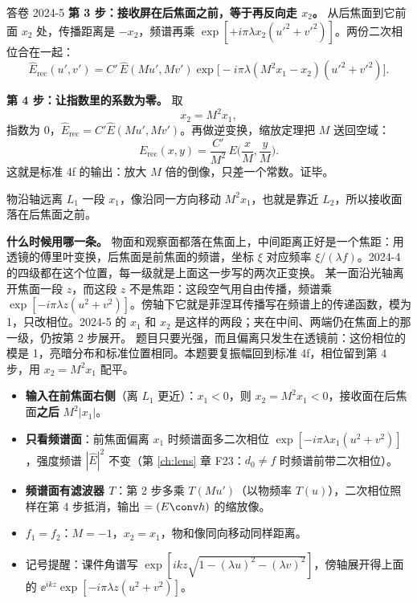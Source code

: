 \begin{exam}{答卷 2024-5}
\textbf{第 3 步：接收屏在后焦面之前，等于再反向走 $x_2$。}
从后焦面到它前面 $x_2$ 处，传播距离是 $-x_2$，频谱再乘 $\exp[+i\pi\lambda x_2(u'^2+v'^2)]$。两份二次相位合在一起：
\[
\hat E_{\text{rec}}(u',v')=C'\,\hat E(Mu',Mv')\exp\!\big[-i\pi\lambda(M^2x_1-x_2)(u'^2+v'^2)\big].
\]

\textbf{第 4 步：让指数里的系数为零。}
取
\[
\boxed{x_2=M^2x_1},
\]
指数为 0，$\hat E_{\text{rec}}=C'\hat E(Mu',Mv')$。再做逆变换，缩放定理把 $M$ 送回空域：
\[
E_{\text{rec}}(x,y)=\frac{C'}{M^2}\,E\Big(\frac xM,\frac yM\Big).
\]
这就是标准 4f 的输出：放大 $M$ 倍的倒像，只差一个常数。证毕。

物沿轴远离 $L_1$ 一段 $x_1$，像沿同一方向移动 $M^2x_1$，也就是靠近 $L_2$，所以接收面落在后焦面之前。

\textbf{什么时候用哪一条。}
物面和观察面都落在焦面上，中间距离正好是一个焦距：用透镜的傅里叶变换，后焦面是前焦面的频谱，坐标 $\xi$ 对应频率 $\xi/(\lambda f)$。2024-4 的四级都在这个位置，每一级就是上面这一步写的两次正变换。
某一面沿光轴离开焦面一段 $z$，而这段 $z$ 不是焦距：这段空气用自由传播，频谱乘 $\exp[-i\pi\lambda z(u^2+v^2)]$。傍轴下它就是菲涅耳传播写在频谱上的传递函数，模为 1，只改相位。2024-5 的 $x_1$ 和 $x_2$ 是这样的两段；夹在中间、两端仍在焦面上的那一级，仍按第 2 步展开。
题目只要光强，而且偏离只发生在透镜前：这份相位的模是 1，亮暗分布和标准位置相同。本题要复振幅回到标准 4f，相位留到第 4 步，用 $x_2=M^2x_1$ 配平。
\end{exam}

\begin{warn}[变式]
\begin{itemize}
\item \textbf{输入在前焦面右侧}（离 $L_1$ 更近）：$x_1<0$，则 $x_2=M^2x_1<0$，接收面在后焦面\textbf{之后} $M^2|x_1|$。
\item \textbf{只看频谱面}：前焦面偏离 $x_1$ 时频谱面多二次相位 $\exp[-i\pi\lambda x_1(u^2+v^2)]$，强度频谱 $|\hat E|^2$ 不变（第 \ref{ch:lens} 章 F23：$d_0\ne f$ 时频谱前带二次相位）。
\item \textbf{频谱面有滤波器 $T$}：第 2 步多乘 $T(Mu')$（以物频率 $T(u)$），二次相位照样在第 4 步抵消，输出 $=(E\conv h)$ 的缩放像。
\item \textbf{$f_1=f_2$}：$M=-1$，$x_2=x_1$，物和像同向移动同样距离。
\item 记号提醒：课件角谱写 $\exp[ikz\sqrt{1-(\lambda u)^2-(\lambda v)^2}]$，傍轴展开得上面的 $\ee^{ikz}\exp[-i\pi\lambda z(u^2+v^2)]$。
\end{itemize}
\end{warn}

